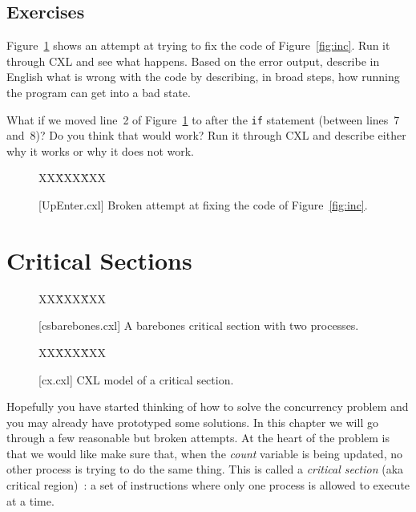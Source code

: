 \documentclass{report}
\newcommand{\cxlsource}[1]{
\begin{tabbing}
XX\=XXX\=XXX\kill
    
\end{tabbing}
}
\newenvironment{code}{
\tcolorbox
}{
\endtcolorbox
}
\begin{document}
\section*{Exercises}

\begin{problems}
\item Figure~\ref{fig:incenter} shows an attempt at trying to fix the code of
    Figure~\ref{fig:inc}.  Run it through CXL and see what happens.  Based on
    the error output, describe in English what is wrong with the code by describing,
    in broad steps, how running the program can get into a bad state.
\item What if we moved line~2 of Figure~\ref{fig:incenter} to after the \texttt{if}
    statement (between lines~7 and~8)?  Do you think that would work?  Run it through
    CXL and describe either why it works or why it does not work.
\end{problems}

\begin{figure}
\begin{code}
\cxlsource{UpEnter}
\end{code}
\caption{[UpEnter.cxl] Broken attempt at fixing the code of Figure~\ref{fig:inc}.}
\label{fig:incenter}
\end{figure}

\chapter{Critical Sections}
\label{ch:critical}

\begin{figure}
\begin{code}
\cxlsource{csbarebones}
\end{code}
\caption{[csbarebones.cxl] A barebones critical section with two processes.}
\label{fig:csbarebones}
\end{figure}

\begin{figure}
\begin{code}
\cxlsource{cs}
\end{code}
\caption{[cx.cxl] CXL model of a critical section.}
\label{fig:cs}
\end{figure}

Hopefully you have started thinking of how to solve the concurrency
problem and you may already have prototyped some solutions.
In this chapter we will go through a few reasonable but broken attempts.
At the heart of the problem is that we would like make sure that, when
the \textit{count} variable is being updated, no other process is
trying to do the same thing.  This is called a \emph{critical section}
(aka critical region)~\cite{EWD123}:
a set of instructions where only one process is allowed to execute at a
time.
\end{document}
